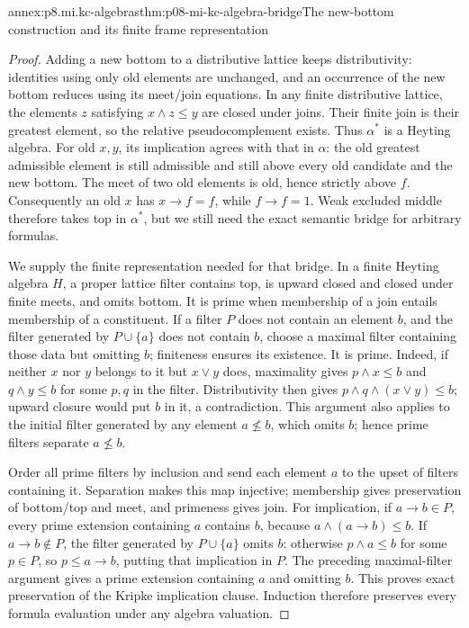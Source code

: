 \begin{annexitem}{annex:p8.mi.kc-algebras}{thm:p08-mi-kc-algebra-bridge}{The new-bottom construction and its finite frame representation}
\begin{proof}
Adding a new bottom to a distributive lattice keeps distributivity:
identities using only old elements are unchanged, and an occurrence
of the new bottom reduces using its meet/join equations. In any finite
distributive lattice, the elements \(z\) satisfying \(x\wedge z\leq y\)
are closed under joins. Their finite join is their greatest element,
so the relative pseudocomplement exists. Thus \(\alpha^*\) is a
Heyting algebra. For old \(x,y\), its implication agrees with that
in \(\alpha\): the old greatest admissible element is still
admissible and still above every old candidate and the new bottom.
The meet of two old elements is old, hence strictly above \(f\).
Consequently an old \(x\) has \(x\to f=f\), while \(f\to f=1\).
Weak excluded middle therefore takes top in \(\alpha^*\), but we
still need the exact semantic bridge for arbitrary formulas.

We supply the finite representation needed for that bridge. In a finite
Heyting algebra \(H\), a proper lattice filter contains top, is upward
closed and closed under finite meets, and omits bottom. It is prime
when membership of a join entails membership of a constituent.
If a filter \(P\) does not contain an element \(b\), and the
filter generated by \(P\cup\{a\}\) does not contain \(b\),
choose a maximal filter containing those data but omitting \(b\);
finiteness ensures its existence. It is prime. Indeed, if neither
\(x\) nor \(y\) belongs to it but \(x\vee y\) does, maximality
gives \(p\wedge x\leq b\) and \(q\wedge y\leq b\) for
some \(p,q\) in the filter. Distributivity then gives
\(p\wedge q\wedge(x\vee y)\leq b\); upward closure would put
\(b\) in it, a contradiction. This argument also applies to the
initial filter generated by any element \(a\not\leq b\), which
omits \(b\); hence prime filters separate \(a\not\leq b\).

Order all prime filters by inclusion and send each element \(a\)
to the upset of filters containing it. Separation makes this map
injective; membership gives preservation of bottom/top and meet,
and primeness gives join. For implication, if \(a\to b\in P\),
every prime extension containing \(a\) contains \(b\), because
\(a\wedge(a\to b)\leq b\). If \(a\to b\notin P\), the
filter generated by \(P\cup\{a\}\) omits \(b\): otherwise
\(p\wedge a\leq b\) for some \(p\in P\), so
\(p\leq a\to b\), putting that implication in \(P\).
The preceding maximal-filter argument gives a prime extension
containing \(a\) and omitting \(b\). This proves exact preservation
of the Kripke implication clause. Induction therefore preserves
every formula evaluation under any algebra valuation.


\end{proof}
\end{annexitem}
